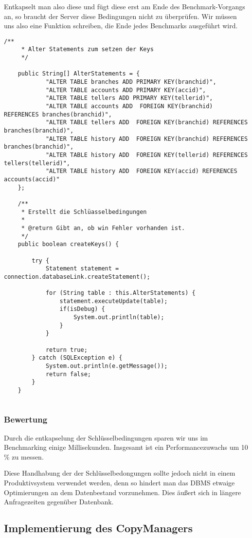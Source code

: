 Entkapselt man also diese und fügt diese erst am Ende des Benchmark-Vorgangs
an, so braucht der Server diese Bedingungen nicht zu überprüfen. Wir müssen uns
also eine Funktion schreiben, die Ende jedes Benchmarks ausgeführt wird.
\begin{lstlisting}[caption={Alter Statements \& Funktion createKeys}]
	/**
	 * Alter Statements zum setzen der Keys
	 */
	
	public String[] AlterStatements = {
			"ALTER TABLE branches ADD PRIMARY KEY(branchid)",
			"ALTER TABLE accounts ADD PRIMARY KEY(accid)",
			"ALTER TABLE tellers ADD PRIMARY KEY(tellerid)",
			"ALTER TABLE accounts ADD  FOREIGN KEY(branchid) REFERENCES branches(branchid)",
			"ALTER TABLE tellers ADD  FOREIGN KEY(branchid) REFERENCES branches(branchid)",
			"ALTER TABLE history ADD  FOREIGN KEY(branchid) REFERENCES branches(branchid)",
			"ALTER TABLE history ADD  FOREIGN KEY(tellerid) REFERENCES tellers(tellerid)",
			"ALTER TABLE history ADD  FOREIGN KEY(accid) REFERENCES accounts(accid)"
	};
	
	/**
	 * Erstellt die Schlüasselbedingungen
	 * 
	 * @return Gibt an, ob win Fehler vorhanden ist.
	 */
	public boolean createKeys() {
	
		try {
			Statement statement = connection.databaseLink.createStatement();

			for (String table : this.AlterStatements) {
				statement.executeUpdate(table);
				if(isDebug) {
					System.out.println(table);
				}
			}

			return true;
		} catch (SQLException e) {
			System.out.println(e.getMessage());
			return false;
		}
	}
		
\end{lstlisting}

\subsubsection*{Bewertung}
Durch die entkapselung der Schlüsselbedingungen sparen wir uns im Benchmarking
einige Millisekunden. Insgesamt ist ein Performancezuwachs um 10 \% zu messen. 
 
 Diese Handhabung der der Schlüsselbedongungen sollte jedoch nicht in einem
 Produktivsystem verwendet werden, denn so hindert man das DBMS etwaige
 Optimierungen an dem Datenbestand vorzunehmen. Dies äußert sich in längere
 Anfragezeiten gegenüber Datenbank.
\clearpage

\subsection{Implementierung des CopyManagers}
